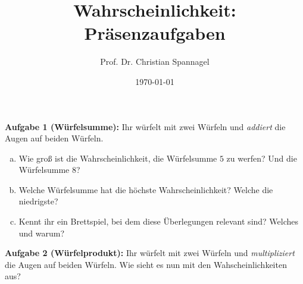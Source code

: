 \documentclass{cssheet}
\title{Wahrscheinlichkeit: Präsenzaufgaben}
\author{Prof. Dr. Christian Spannagel}
\date{\today}
\begin{document}
\printtitle

\vspace*{10mm}

\textbf{Aufgabe 1 (Würfelsumme):} Ihr würfelt mit zwei Würfeln und \emph{addiert} die Augen auf beiden Würfeln. 

\begin{enumerate}[a)]
\item Wie groß ist die Wahrscheinlichkeit, die Würfelsumme $5$ zu werfen? Und die Würfelsumme $8$?
\item Welche Würfelsumme hat die höchste Wahrscheinlichkeit? Welche die niedrigste?
\item  Kennt ihr ein Brettspiel, bei dem diese Überlegungen relevant sind? Welches und warum?
\end{enumerate}

\textbf{Aufgabe 2 (Würfelprodukt):} Ihr würfelt mit zwei Würfeln und \emph{multipliziert} die Augen auf beiden Würfeln. Wie sieht es nun mit den Wahscheinlichkeiten aus?

\

\vspace*{3cm}

\printlicense

\printsocials
\end{document}
